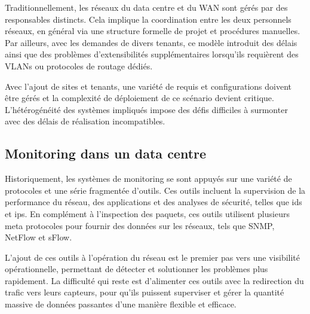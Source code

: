 Traditionnellement,  les réseaux du data centre et du WAN sont gérés  par des responsables distincts. Cela implique la coordination entre les deux personnels réseaux, en général via une structure formelle de projet et procédures manuelles. Par ailleurs, avec les demandes de divers tenants, ce modèle introduit des délais ainsi que des problèmes d'extensibilités supplémentaires lorsqu'ils requièrent des VLANs ou protocoles de routage dédiés.

Avec l'ajout de sites et tenants, une variété de requis et configurations doivent être gérés et la complexité de déploiement de ce scénario devient critique. L'hétérogénéité des systèmes impliqués impose des défis difficiles à surmonter avec des délais de réalisation incompatibles. \cite{leveragingSDNCloudDCWAN} \cite{zkCloudIntelligentNetwork}


\subsection{Monitoring dans un data centre}

Historiquement, les systèmes de monitoring se sont appuyés sur une variété de protocoles et une série fragmentée d'outils. Ces outils incluent la supervision de la performance du réseau, des applications et des analyses de sécurité, telles que \gls{ids} et \gls{ips}. En complément à l'inspection des paquets, ces outils utilisent plusieurs meta protocoles pour fournir des données sur les réseaux, tels que SNMP, NetFlow et sFlow.

L'ajout de ces outils à l'opération du réseau est le premier pas vers une visibilité opérationnelle, permettant de détecter et solutionner les problèmes plus rapidement. La difficulté qui reste est d'alimenter ces outils avec la redirection du trafic vers leurs capteurs, pour qu'ils puissent superviser et gérer la quantité massive de données passantes d'une manière flexible et efficace. 

